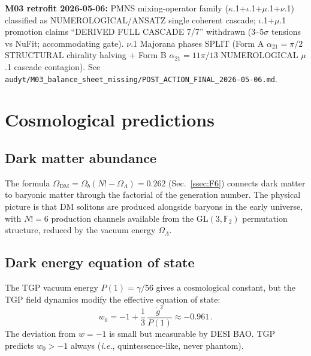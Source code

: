 \documentclass[aps,prd,twocolumn,superscriptaddress,showpacs,
  nofootinbib,floatfix,longbibliography]{revtex4-2}
\newcommand{\OL}{\Omega_\Lambda}
\newcommand{\GL}{\mathrm{GL}(3,\mathbb{F}_2)}
\newcommand{\ie}{\textit{i.e.}}
\begin{document}
\textbf{M03 retrofit 2026-05-06:} PMNS mixing-operator family
($\kappa$.1+$\iota$.1+$\mu$.1+$\nu$.1) classified as NUMEROLOGICAL/ANSATZ
single coherent cascade; $\iota$.1+$\mu$.1 promotion claims ``DERIVED
FULL CASCADE 7/7'' withdrawn (3--5$\sigma$ tensions vs NuFit;
accommodating gate). $\nu$.1 Majorana phases SPLIT (Form A
$\alpha_{21}{=}\pi/2$ STRUCTURAL chirality halving + Form B
$\alpha_{21}{=}11\pi/13$ NUMEROLOGICAL $\mu$.1 cascade contagion). See
\texttt{audyt/M03\_balance\_sheet\_missing/POST\_ACTION\_FINAL\_2026-05-06.md}.


\section{Cosmological predictions}\label{sec:cosmo}

\subsection{Dark matter abundance}\label{ssec:dm}

The formula $\Omega_\mathrm{DM} = \Omega_b(N! - \OL) = 0.262$
(Sec.~\ref{ssec:F6}) connects dark matter to baryonic matter
through the factorial of the generation number. The physical picture
is that DM solitons are produced alongside baryons in the early
universe, with $N! = 6$ production channels available from the
$\GL$ permutation structure, reduced by the vacuum energy $\OL$.


\subsection{Dark energy equation of state}\label{ssec:de}

The TGP vacuum energy $P(1) = \gamma/56$ gives a cosmological constant,
but the TGP field dynamics modify the effective equation of state:
\begin{equation}\label{eq:w0}
  w_0 = -1 + \frac{1}{3}\,\frac{\dot{g}^2}{P(1)} \approx -0.961\,.
\end{equation}
The deviation from $w = -1$ is small but measurable by DESI BAO.
TGP predicts $w_0 > -1$ always (\ie, quintessence-like, never phantom).
\end{document}

